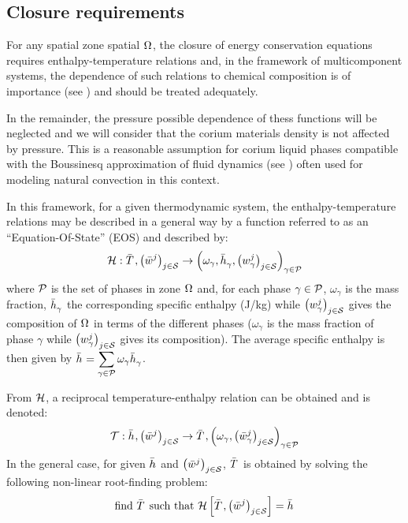 \subsection{Closure requirements} \label{sect:req}

For any spatial zone spatial $\Omega_{}$, the closure of energy conservation equations requires enthalpy-temperature relations and, in the framework of multicomponent systems, the dependence of such relations to chemical composition is of importance (see \cite{Schneider1991}) and should be treated adequately. 

\begin{remark}
In the remainder, the pressure possible dependence of thess functions will be neglected and we will consider that the corium materials density is not affected by pressure. This is a reasonable assumption for corium liquid phases compatible with the Boussinesq approximation of fluid dynamics (see \cite{Hills1991}) often used for modeling natural convection in this context.
\end{remark}

In this framework, for a given thermodynamic system, the enthalpy-temperature relations may be described in a general way by a function referred to as an ``Equation-Of-State'' (EOS) and described by:
\begin{equation}
 \Mc{H}: \avTemperature{}, \left(\avMassFraction[j]{}\right)_{j\in \speciesSet} \rightarrow  \left(\omega_\gamma, \avMassEnthalpy{\gamma}, \left(\massFraction[j]{\gamma}\right)_{j\in \speciesSet}\right)_{\gamma \in \phaseSet} \label{eq:eos}
\end{equation}
where $\phaseSet$ is the set of phases in zone $\Omega_{}$ and, for each phase $\gamma \in \phaseSet$, $\omega_\gamma$ is the mass fraction, $\avMassEnthalpy{\gamma}$ the corresponding specific enthalpy (J/kg) while $\left(\massFraction[j]{\gamma}\right)_{j\in \speciesSet}$ gives the composition of $\Omega_{}$ in terms of the different phases ($\omega_\gamma$ is the mass fraction of phase $\gamma$ while $\left(\massFraction[j]{\gamma}\right)_{j\in \speciesSet}$ gives its composition). The average specific enthalpy is then given by $\avMassEnthalpy{} = \displaystyle \sum_{\gamma \in \phaseSet} \omega_\gamma \avMassEnthalpy{\gamma}$.

From ${\mathcal H}$, a reciprocal temperature-enthalpy relation can be obtained and is denoted:
\begin{equation}
\Mc{T}: \avMassEnthalpy{}, \left(\avMassFraction[j]{}\right)_{j\in \speciesSet} \rightarrow \avTemperature{}, \left(\omega_\gamma, \left(\avMassFraction[j]{\gamma}\right)_{j\in \speciesSet}\right)_{\gamma \in \phaseSet}
\end{equation}
In the general case, for given $\avMassEnthalpy{}$ and $\left(\avMassFraction[j]{}\right)_{j\in \speciesSet}$, $\avTemperature{}$ is obtained by solving the following non-linear root-finding problem: 
\begin{equation}
 \text{find } \avTemperature{} \text{ such that }\Mc{H}\left[\avTemperature{}, \left(\avMassFraction[j]{}\right)_{j\in \speciesSet}\right] = \avMassEnthalpy{} \label{eq:t(h)}
\end{equation}

